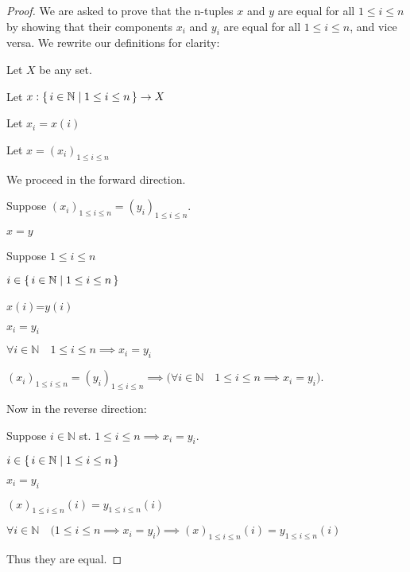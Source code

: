 \documentclass[../../main.tex]{subfiles}
\begin{document}
\begin{proof}
    We are asked to prove that the n-tuples $x$ and $y$ are equal for all $1 \leq i \leq n$ by showing that their components $x_i$ and $y_i$ are equal for all  $1 \leq i \leq n$, and vice versa. We rewrite our definitions for clarity:
    \begin{linebyline}
        \item Let $X$ be any set. 
        \item Let $x : \{\,i \in \mathbb{N}\mid1 \leq i \leq n\,\} \to X$
        \item Let $x_i = x(i)$ 
        \item Let $x = (x_i)_{1 \leq i \leq n}$
    \end{linebyline}
    We proceed in the forward direction.
    \begin{linebyline}[resume]
        \item Suppose $(x_i)_{1 \leq i \leq n} = (y_i)_{1 \leq i \leq n}$.
        \begin{linebyline}
            \item $x = y$ 
            \item Suppose ${1 \leq i \leq n}$
            \begin{linebyline}
                \item $i \in \{\,i \in \mathbb{N}\mid1 \leq i \leq n\,\}$
                \item $x(i)$=$y(i)$ 
                \item $x_i=y_i$ 
            \end{linebyline}
            \item $\forall i \in \mathbb{N} \quad {1 {\leq} i {\leq} n} \implies x_i=y_i$
        \end{linebyline}
        \item $(x_i)_{1 \leq i \leq n} = (y_i)_{1 \leq i \leq n} \implies \bigl( \forall i \in \mathbb{N} \quad {1 {\leq} i {\leq} n} \implies x_i=y_i \bigr)$.
    \end{linebyline}
    Now in the reverse direction:
    \begin{linebyline}[resume]
        \item Suppose $i \in \mathbb{N}$ st. ${1 {\leq} i {\leq} n} \implies x_i=y_i$.
        \begin{linebyline}
            \item $i \in \{\,i \in \mathbb{N}\mid1 \leq i \leq n\,\}$ 
            \item $x_i=y_i$ 
            \item $(x)_{1 \leq i \leq n}(i)=y_{1 \leq i \leq n}(i)$ 
        \end{linebyline}
        \item $\forall i \in \mathbb{N} \quad \bigl({1 {\leq} i {\leq} n} \implies x_i=y_i \bigr) \implies (x)_{1 \leq i \leq n}(i)=y_{1 \leq i \leq n}(i)$ 
    \end{linebyline}\item
    Thus they are equal.
\end{proof}
\begin{xx}

\end{xx}
\end{document}
